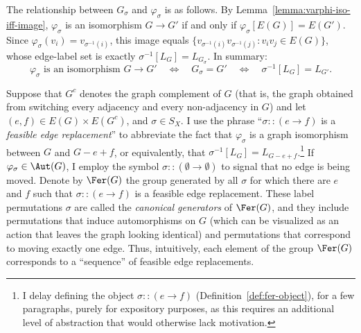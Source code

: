 The relationship between $G_\sigma$ and $\varphi_\sigma$ is as follows.
By Lemma~\ref{lemma:varphi-iso-iff-image}, $\varphi_\sigma$ is an isomorphism $G\to G'$ if and only if $\varphi_\sigma[E(G)]=E(G')$.
Since $\varphi_\sigma(v_i)=v_{\sigma^{-1}(i)}$, this image equals $\{v_{\sigma^{-1}(i)}v_{\sigma^{-1}(j)}:v_iv_j\in E(G)\}$, whose edge-label set is exactly $\sigma^{-1}[L_G]=L_{G_\sigma}$.
In summary:
\begin{equation}\label{eq:gsigma-varphi}
    \varphi_\sigma \text{ is an isomorphism } G\to G' \quad\Longleftrightarrow\quad G_\sigma = G' \quad\Longleftrightarrow\quad \sigma^{-1}[L_G]=L_{G'}.
\end{equation}

\begin{center}
\end{center}

Suppose that $G^c$ denotes the graph complement of $G$ (that is, the graph obtained from switching every adjacency and every non-adjacency in $G$) and let $(e,f)\in E(G)\times E(G^c)$, and $\sigma\in S_X$.
I use the phrase ``$\sigma::(e\to f)$ is a \emph{feasible edge replacement}'' to abbreviate the fact that $\varphi_\sigma$ is a graph isomorphism between $G$ and $G-e+f$, or equivalently, that $\sigma^{-1}[L_G]=L_{G-e+f}$.\footnote{I delay defining the object $\sigma::(e\to f)$ (Definition~\ref{def:fer-object}), for a few paragraphs, purely for expository purposes, as this requires an additional level of abstraction that would otherwise lack motivation.}
If $\varphi_\sigma\in\Aut(G)$, I employ the symbol $\sigma::(\emptyset\to\emptyset)$ to signal that no edge is being moved.
Denote by $\Fer(G)$ the group generated by all $\sigma$ for which there are $e$ and $f$ such that $\sigma::(e\to f)$ is a feasible edge replacement.
These label permutations $\sigma$ are called the \emph{canonical generators} of $\Fer(G)$, and they include permutations that induce automorphisms on $G$ (which can be visualized as an action that leaves the graph looking identical) and permutations that correspond to moving exactly one edge.
Thus, intuitively, each element of the group $\Fer(G)$ corresponds to a ``sequence'' of feasible edge replacements.

